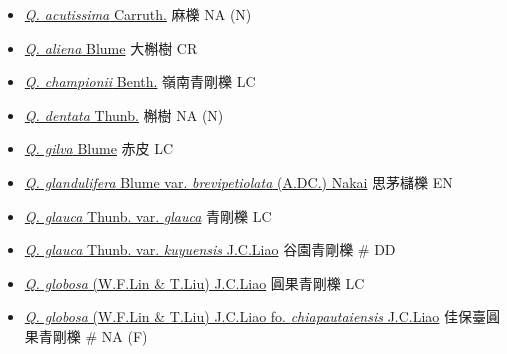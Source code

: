 \begin{itemize}
  \begin{itemize}
        \item[] \href{http://www.theplantlist.org/tpl1.1/search?q=Quercus+acutissima}{\textit{Q. acutissima} Carruth.}   麻櫟   NA (N)
        \item[] \href{http://www.theplantlist.org/tpl1.1/search?q=Quercus+aliena}{\textit{Q. aliena} Blume}   大槲樹   CR
        \item[] \href{http://www.theplantlist.org/tpl1.1/search?q=Quercus+championii}{\textit{Q. championii} Benth.}   嶺南青剛櫟   LC
        \item[] \href{http://www.theplantlist.org/tpl1.1/search?q=Quercus+dentata}{\textit{Q. dentata} Thunb.}   槲樹   NA (N)
        \item[] \href{http://www.theplantlist.org/tpl1.1/search?q=Quercus+gilva}{\textit{Q. gilva} Blume}   赤皮   LC
        \item[] \href{http://www.theplantlist.org/tpl1.1/search?q=Quercus+glandulifera+var.+brevipetiolata}{\textit{Q. glandulifera} Blume var. \textit{brevipetiolata} (A.DC.) Nakai}   思茅櫧櫟   EN
        \item[] \href{http://www.theplantlist.org/tpl1.1/search?q=Quercus+glauca+var.+glauca}{\textit{Q. glauca} Thunb. var. \textit{glauca}}   青剛櫟   LC
        \item[] \href{http://www.theplantlist.org/tpl1.1/search?q=Quercus+glauca+var.+kuyuensis}{\textit{Q. glauca} Thunb. var. \textit{kuyuensis} J.C.Liao}   谷園青剛櫟  \# DD
        \item[] \href{http://www.theplantlist.org/tpl1.1/search?q=Quercus+globosa}{\textit{Q. globosa} (W.F.Lin \& T.Liu) J.C.Liao}   圓果青剛櫟   LC
        \item[] \href{http://www.theplantlist.org/tpl1.1/search?q=Quercus+globosa+fo.+chiapautaiensis}{\textit{Q. globosa} (W.F.Lin \& T.Liu) J.C.Liao fo. \textit{chiapautaiensis} J.C.Liao}   佳保臺圓果青剛櫟  \# NA (F)

\end{itemize}
\end{itemize}
